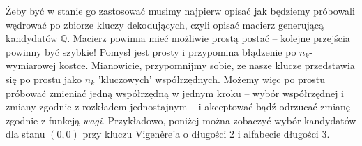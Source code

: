 \documentclass[a4paper]{article}
\theoremstyle{defn}
\theoremstyle{theorem}
\theoremstyle{lemma}
\theoremstyle{cor}
\theoremstyle{fact}
\begin{document}
Żeby być w stanie go zastosować musimy najpierw opisać jak będziemy próbowali wędrować po zbiorze kluczy dekodujących, czyli opisać macierz generującą kandydatów $\mathbb{Q}$. Macierz powinna mieć możliwie prostą postać – kolejne przejścia powinny być szybkie! Pomysł jest prosty i przypomina błądzenie po $n_k$-wymiarowej kostce. Mianowicie, przypomnijmy sobie, ze nasze klucze przedstawia się po prostu jako $n_k$ 'kluczowych' współrzędnych. Możemy więc po prostu próbować zmieniać jedną współrzędną w jednym kroku – wybór współrzędnej i zmiany zgodnie z rozkładem jednostajnym – i akceptować bądź odrzucać zmianę zgodnie z funkcją \textit{wagi}. Przykładowo, poniżej można zobaczyć wybór kandydatów dla stanu $(0,0)$ przy kluczu Vigenère'a o długości 2 i alfabecie długości 3.\\\\
\end{document}
